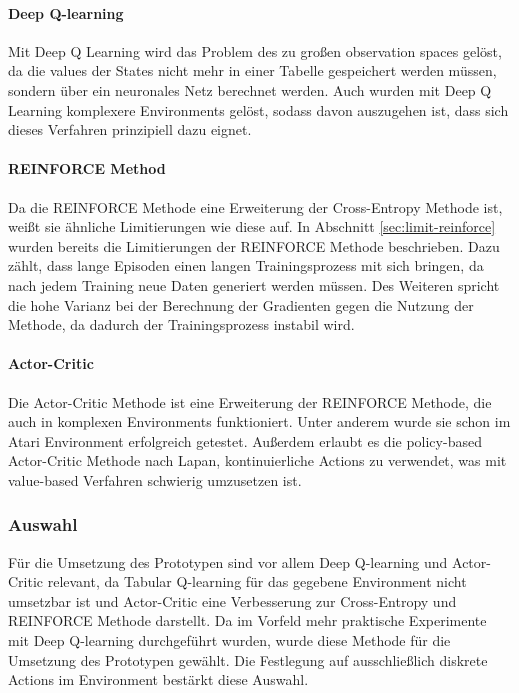 \documentclass[11pt]{scrartcl}
\begin{document}
\paragraph{Deep Q-learning}
Mit Deep Q Learning wird das Problem des zu großen observation spaces gelöst, da die
values der States nicht mehr in einer Tabelle gespeichert werden müssen, sondern über ein
neuronales Netz berechnet werden. Auch wurden mit Deep Q Learning komplexere Environments
gelöst, sodass davon auszugehen ist, dass sich dieses Verfahren prinzipiell dazu eignet.

\paragraph{REINFORCE Method}
Da die REINFORCE Methode eine Erweiterung der Cross-Entropy Methode ist, weißt sie
ähnliche Limitierungen wie diese auf. In Abschnitt \ref{sec:limit-reinforce} wurden
bereits die Limitierungen der REINFORCE Methode beschrieben. Dazu zählt, dass lange
Episoden einen langen Trainingsprozess mit sich bringen, da nach jedem Training neue 
Daten generiert werden müssen. Des Weiteren spricht die hohe Varianz bei der Berechnung
der Gradienten gegen die Nutzung der Methode, da dadurch der Trainingsprozess instabil
wird.

\paragraph{Actor-Critic}
Die Actor-Critic Methode ist eine Erweiterung der REINFORCE Methode, die auch in komplexen
Environments funktioniert. Unter anderem wurde sie schon im Atari Environment erfolgreich
getestet. Außerdem erlaubt es die policy-based Actor-Critic Methode nach Lapan,
kontinuierliche Actions zu verwendet, was \cite[~S.346]{L2018} mit value-based Verfahren
schwierig umzusetzen ist.

\subsubsection{Auswahl}
Für die Umsetzung des Prototypen sind vor allem Deep Q-learning und Actor-Critic relevant,
da Tabular Q-learning für das gegebene Environment nicht umsetzbar ist und Actor-Critic
eine Verbesserung zur Cross-Entropy und REINFORCE Methode darstellt. Da im Vorfeld mehr
praktische Experimente mit Deep Q-learning durchgeführt wurden, wurde diese Methode für
die Umsetzung des Prototypen gewählt. Die Festlegung auf ausschließlich diskrete Actions
im Environment bestärkt diese Auswahl.
\end{document}
